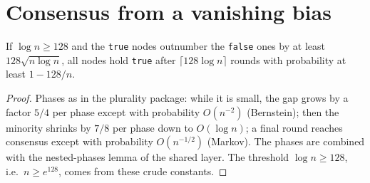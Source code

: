 \section{Consensus from a vanishing bias}
\begin{theorem}[2-Choices, w.h.p.]\label{thm:whp}
\leanok{}
If $\log n\ge 128$ and the \texttt{true} nodes outnumber the \texttt{false} ones by at least
$128\sqrt{n\log n}$, all nodes hold \texttt{true} after $\lceil 128\log n\rceil$ rounds with
probability at least $1-128/n$.
\end{theorem}
\begin{proof}\leanok
Phases as in the plurality package: while it is small, the gap grows by a factor $5/4$ per phase
except with probability $O(n^{-2})$ (Bernstein); then the minority shrinks by $7/8$ per phase down
to $O(\log n)$; a final round reaches consensus except with probability $O(n^{-1/2})$ (Markov). The
phases are combined with the nested-phases lemma of the shared layer. The threshold
$\log n\ge128$, i.e.\ $n\ge e^{128}$, comes from these crude constants.
\end{proof}

